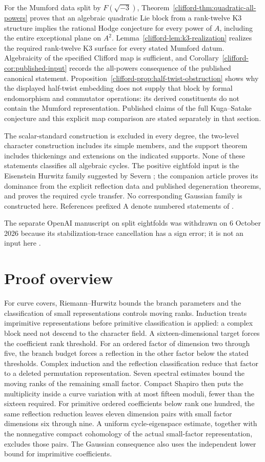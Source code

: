 \documentclass[11pt]{article}
\theoremstyle{definition}
\theoremstyle{remark}
\begin{document}
For the Mumford data split by $F(\sqrt{-3})$,
Theorem~\ref{clifford-thm:quadratic-all-powers} proves that an algebraic
quadratic Lie block from a rank-twelve K3 structure implies the rational
Hodge conjecture for every power of $A$, including the entire
exceptional plane on $A^2$. Lemma~\ref{clifford-lem:k3-realization} realizes the required
rank-twelve K3 surface for every stated Mumford datum. Algebraicity
of the specified Clifford map is sufficient, and
Corollary~\ref{clifford-cor:published-input} records the all-powers
consequence of the published canonical statement. Proposition~\ref{clifford-prop:half-twist-obstruction}
shows why the displayed half-twist embedding does not supply that
block by formal endomorphism and commutator operations: its derived
constituents do not contain the Mumford representation. Published
claims of the full Kuga--Satake conjecture and this explicit map
comparison are stated separately in that section.

The scalar-standard construction is excluded in every degree, the
two-level character construction includes its simple members, and the
support theorem includes thickenings and extensions on the indicated
supports. None of these statements classifies all algebraic cycles.
The positive eightfold input is the Eisenstein Hurwitz family
suggested by Severn \cite{Severn}; the companion article proves its
dominance from the explicit reflection data and published degeneration
theorems, and proves the required cycle transfer.  No corresponding
Gaussian family is constructed here.
References prefixed A denote numbered statements of \cite{CompanionA}.

The separate OpenAI manuscript on split eightfolds was withdrawn on
6 October 2026 because its stabilization-trace cancellation has a sign
error; it is not an input here \cite{OpenAIEightWithdrawn}.

\section{Proof overview}\label{sec:overview-b}
For curve covers, Riemann--Hurwitz bounds the branch parameters and
the classification of small representations controls moving ranks.
Induction treats imprimitive representations before primitive
classification is applied: a complex block need not descend to the
character field. A sixteen-dimensional target forces the coefficient
rank threshold. For an ordered factor of dimension two through
five, the branch budget forces a reflection in the other factor
below the stated thresholds. Complex induction and the reflection
classification reduce that factor to a deleted permutation
representation. Seven spectral estimates bound the moving ranks
of the remaining small factor. Compact Shapiro then puts the
multiplicity inside a curve variation with at most fifteen moduli,
fewer than the sixteen required. For primitive ordered coefficients
below rank one hundred, the same reflection reduction leaves eleven
dimension pairs with small factor dimensions six through nine.
A uniform cycle-eigenspace estimate, together with the nonnegative
compact cohomology of the actual small-factor representation,
excludes those pairs. The Gaussian consequence also uses the
independent lower bound for imprimitive coefficients.
\end{document}

